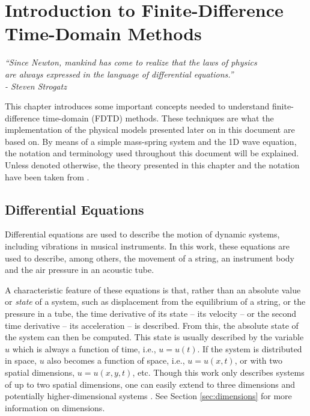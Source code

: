\chapter{Introduction to Finite-Difference Time-Domain Methods}\label{ch:FDTD}

\begin{flushright}{\it
``Since Newton, mankind has come to realize that the laws of physics\\
are always expressed in the language of differential equations.''\\
- Steven Strogatz} %
\end{flushright}
%
\vspace{2em}
This chapter introduces some important concepts needed to understand finite-difference time-domain (FDTD) methods. These techniques are what the implementation of the physical models presented later on in this document are based on. 
By means of a simple mass-spring system and the 1D wave equation, the notation and terminology used throughout this document will be explained. 
Unless denoted otherwise, the theory presented in this chapter and the notation have been taken from \cite{theBible}. %

\section{Differential Equations}\label{sec:differentialEquations}
Differential equations are used to describe the motion of dynamic systems, including vibrations in musical instruments. In this work, these equations are used to describe, among others, the movement of a string, an instrument body and the air pressure in an acoustic tube.

A characteristic feature of these equations is that, rather than an absolute value or \textit{state} of a system, such as displacement from the equilibrium of a string, or the pressure in a tube, the time derivative of its state -- its velocity -- or the second time derivative -- its acceleration -- is described. From this, the absolute state of the system can then be computed.
%
This state is usually described by the variable $u$ which is always a function of time, i.e., $u=u(t)$. If the system is distributed in space, $u$ also becomes a function of space, i.e., $u = u(x,t)$, or with two spatial dimensions, $u = u(x,y,t)$, etc. Though this work only describes systems of up to two spatial dimensions, one can easily extend to three dimensions \cite{Hamilton2016} and potentially higher-dimensional systems%
. See Section \ref{sec:dimensions} for more information on dimensions.

